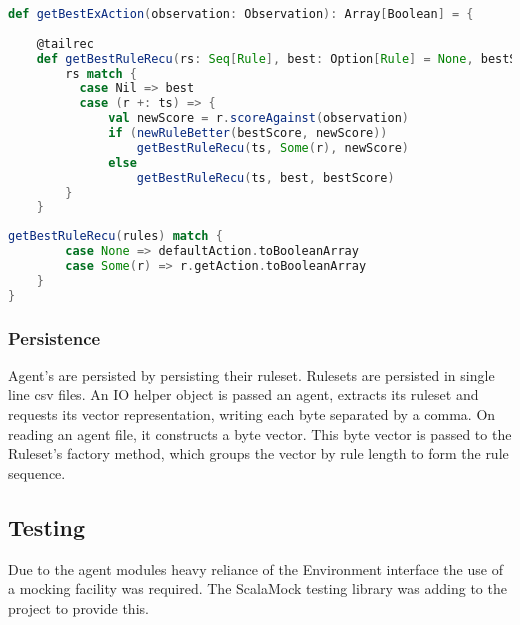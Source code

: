 \begin{minipage}{0.9\linewidth}
\centering
\begin{lstlisting}[language=scala]
def getBestExAction(observation: Observation): Array[Boolean] = {
    
    @tailrec
    def getBestRuleRecu(rs: Seq[Rule], best: Option[Rule] = None, bestScore: Int = 0): Option[Rule] = 
        rs match {
          case Nil => best
          case (r +: ts) => {
              val newScore = r.scoreAgainst(observation)
              if (newRuleBetter(bestScore, newScore))
                  getBestRuleRecu(ts, Some(r), newScore)
              else
                  getBestRuleRecu(ts, best, bestScore)
        }
    }
\end{lstlisting}
\end{minipage}
    
\begin{minipage}{0.9\linewidth}
\centering
\begin{lstlisting}[language=scala]
    getBestRuleRecu(rules) match {
        case None => defaultAction.toBooleanArray
        case Some(r) => r.getAction.toBooleanArray
    }
}
\end{lstlisting}
\end{minipage}


\subsubsection{Persistence}

Agent's are persisted by persisting their ruleset. Rulesets are persisted in single line csv files. An IO helper object is passed an agent, extracts its ruleset and requests its vector representation, writing each byte separated by a comma. On reading an agent file, it constructs a byte vector. This byte vector is passed to the Ruleset's factory method, which groups the vector by rule length to form the rule sequence.


\subsection{Testing}
\label{subsec:agenttest}

Due to the agent modules heavy reliance of the Environment interface the use of a mocking facility was required. The ScalaMock testing library was adding to the project to provide this.

